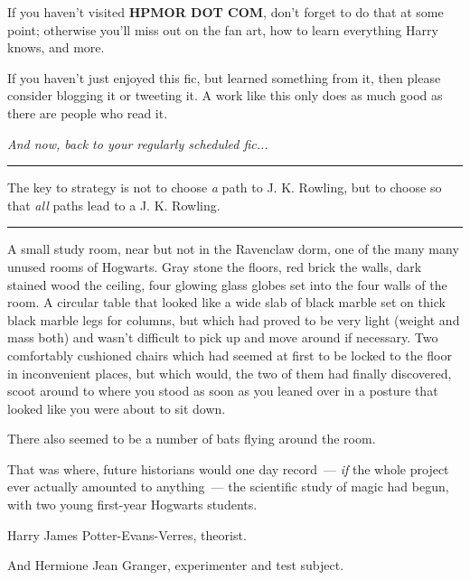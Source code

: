 If you haven't visited \textbf{HPMOR DOT COM}, don't forget to do that at some point; otherwise you'll miss out on the fan art, how to learn everything Harry knows, and more.

If you haven't just enjoyed this fic, but learned something from it, then please consider blogging it or tweeting it. A work like this only does as much good as there are people who read it.

\emph{And now, back to your regularly scheduled fic...}

\begin{center}\rule{3in}{0.4pt}\end{center}

The key to strategy is not to choose \emph{a} path to J. K. Rowling, but to choose so that \emph{all} paths lead to a J. K. Rowling.

\begin{center}\rule{3in}{0.4pt}\end{center}

A small study room, near but not in the Ravenclaw dorm, one of the many many unused rooms of Hogwarts. Gray stone the floors, red brick the walls, dark stained wood the ceiling, four glowing glass globes set into the four walls of the room. A circular table that looked like a wide slab of black marble set on thick black marble legs for columns, but which had proved to be very light (weight and mass both) and wasn't difficult to pick up and move around if necessary. Two comfortably cushioned chairs which had seemed at first to be locked to the floor in inconvenient places, but which would, the two of them had finally discovered, scoot around to where you stood as soon as you leaned over in a posture that looked like you were about to sit down.

There also seemed to be a number of bats flying around the room.

That was where, future historians would one day record~--- \emph{if} the whole project ever actually amounted to anything~--- the scientific study of magic had begun, with two young first-year Hogwarts students.

Harry James Potter-Evans-Verres, theorist.

And Hermione Jean Granger, experimenter and test subject.

